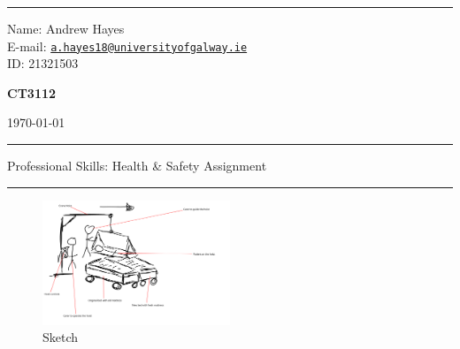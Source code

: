 \documentclass[a4paper]{article}
\begin{document}
\hrule \medskip
\begin{minipage}{0.295\textwidth}
    \raggedright
    \footnotesize
    Name: Andrew Hayes \\
    E-mail: \href{mailto://a.hayes18@universityofgalway.ie}{\texttt{a.hayes18@universityofgalway.ie}}  \hfill\\
    ID: 21321503 \hfill
\end{minipage}
\begin{minipage}{0.4\textwidth}
    \centering
    \vspace{0.4em}
    \Large
    \textbf{CT3112} \\
\end{minipage}
\begin{minipage}{0.295\textwidth}
    \raggedleft
    \today
\end{minipage}
\medskip\hrule
\begin{center}
    \normalsize
    Professional Skills: Health \& Safety Assignment
\end{center}
\hrule

\begin{figure}[h]
    \centering
    \includegraphics[width=0.50\textwidth]{sketch.png}
    \caption{Sketch}
\end{figure}
\end{document}
